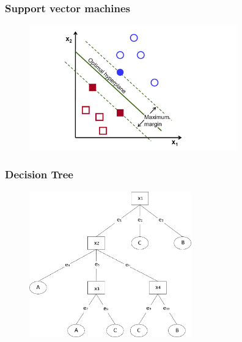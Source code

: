 \documentclass{beamer}
\begin{document}

\begin{frame}
\frametitle{Support vector machines}
\begin{figure}
	\centering
    \includegraphics[width=90mm,scale=1]{./img/SVM.png}
\end{figure}

\end{frame}


\begin{frame} %
\frametitle{Decision Tree}
\begin{figure}
	\centering
    \includegraphics[width=70mm,scale=1]{./img/decisiontree.png}
\end{figure}

\end{frame}
\end{document}
